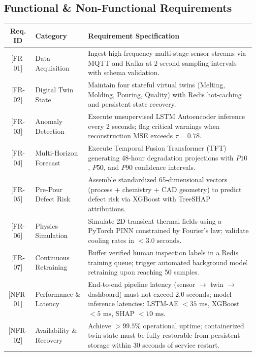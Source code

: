 \documentclass[11pt, a4paper]{article}
\begin{document}
\subsection{Functional \& Non-Functional Requirements}
\begin{table}[H]
    \centering
    \footnotesize
    \renewcommand{\arraystretch}{1.25}
    \begin{tabular}{|c|p{2.8cm}|p{9.4cm}|}
        \hline
        \textbf{Req. ID} & \textbf{Category} & \textbf{Requirement Specification} \\
        \hline
        {[FR-01]} & Data Acquisition & Ingest high-frequency multi-stage sensor streams via MQTT and Kafka at 2-second sampling intervals with schema validation. \\
        \hline
        {[FR-02]} & Digital Twin State & Maintain four stateful virtual twins (Melting, Molding, Pouring, Quality) with Redis hot-caching and persistent state recovery. \\
        \hline
        {[FR-03]} & Anomaly Detection & Execute unsupervised LSTM Autoencoder inference every 2 seconds; flag critical warnings when reconstruction MSE exceeds $\tau = 0.78$. \\
        \hline
        {[FR-04]} & Multi-Horizon Forecast & Execute Temporal Fusion Transformer (TFT) generating 48-hour degradation projections with $P10$, $P50$, and $P90$ confidence intervals. \\
        \hline
        {[FR-05]} & Pre-Pour Defect Risk & Assemble standardized 65-dimensional vectors (process + chemistry + CAD geometry) to predict defect risk via XGBoost with TreeSHAP attributions. \\
        \hline
        {[FR-06]} & Physics Simulation & Simulate 2D transient thermal fields using a PyTorch PINN constrained by Fourier's law; validate cooling rates in $<3.0\text{ seconds}$. \\
        \hline
        {[FR-07]} & Continuous Retraining & Buffer verified human inspection labels in a Redis training queue; trigger automated background model retraining upon reaching 50 samples. \\
        \hline
        {[NFR-01]} & Performance \& Latency & End-to-end pipeline latency (sensor $\rightarrow$ twin $\rightarrow$ dashboard) must not exceed 2.0 seconds; model inference latencies: LSTM-AE $<35\text{ ms}$, XGBoost $<5\text{ ms}$, SHAP $<10\text{ ms}$. \\
        \hline
        {[NFR-02]} & Availability \& Recovery & Achieve $>99.5\%$ operational uptime; containerized twin state must be fully restorable from persistent storage within 30 seconds of service restart. \\

\end{tabular}
\end{table}
\end{document}
